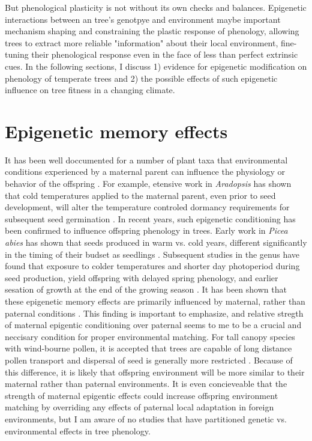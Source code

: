 \documentclass{article}\usepackage[]{graphicx}\usepackage[]{color}
\begin{document}
\par But phenological plasticity is not without its own checks and balances. Epigenetic interactions between an tree's genotpye and environment maybe important mechanism shaping and constraining the plastic response of phenology, allowing trees to extract more reliable "information" about their local environment, fine-tuning their phenological response even in the face of less than perfect extrinsic cues. In the following sections, I discuss 1) evidence for epigenetic modification on phenology of temperate trees and 2) the possible effects of such epigenetic influence on tree fitness in a changing climate.
\section{Epigenetic memory effects}
\par It has been well doccumented for a number of plant taxa that environmental conditions experienced by a maternal parent can influence the physiology or behavior of the offspring \citep{}. For example, etensive work in \textit{Aradopsis} has shown that cold temperatures applied to the maternal parent, even prior to seed development, will alter the temperature controled dormancy requirements for subsequent seed germination \citep{Auge2017}. In recent years, such epigenetic conditioning has been confirmed to influence offspring phenology in trees. Early work in \textit{Picea abies} has shown that seeds produced in warm vs. cold years, different significantly in the timing of their budset as seedlings \citep{Kohmann1994}. Subsequent studies in the genus have found that exposure to colder temperatures and shorter day photoperiod during seed production, yield offspring with delayed spring phenology, and earlier sesation of growth at the end of the growing season \citep{Johnsen2005, Gomery2014}. It has been shown that these epigenetic memory effects are primarily influenced by maternal, rather than paternal conditions \citep{Johnsen1996}. This finding is important to emphasize, and relative stregth of maternal epigentic conditioning over paternal seems to me to be a crucial and neccisary condition for proper environmental matching. For tall canopy species with wind-bourne pollen, it is accepted that trees are capable of long distance pollen transport and dispersal of seed is generally more restricted \citep{}. Because of this difference, it is likely that offspring environment will be more similar to their maternal rather than paternal environments. It is even concieveable that the strength of maternal epigentic effects could increase offspring environment matching by overriding any effects of paternal local adaptation in foreign environments, but I am aware of no studies that have partitioned genetic vs. environmental effects in tree phenology.
\end{document}
